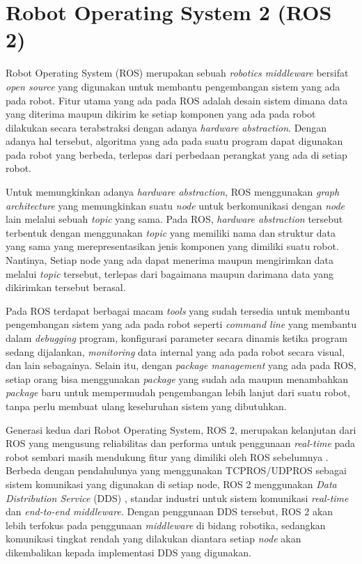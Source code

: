 \section{Robot Operating System 2 (ROS 2)}
\label{sec:ros2}

Robot Operating System (ROS) \citep{cit:quigley2009} merupakan sebuah \emph{robotics middleware} bersifat \emph{open source} yang digunakan untuk membantu pengembangan sistem yang ada pada robot.
Fitur utama yang ada pada ROS adalah desain sistem dimana data yang diterima maupun dikirim ke setiap komponen yang ada pada robot dilakukan secara terabstraksi dengan adanya \emph{hardware abstraction}.
Dengan adanya hal tersebut,
	algoritma yang ada pada suatu program dapat digunakan pada robot yang berbeda,
	terlepas dari perbedaan perangkat yang ada di setiap robot.

Untuk memungkinkan adanya \emph{hardware abstraction},
	ROS menggunakan \emph{graph architecture} yang memungkinkan suatu \emph{node} untuk berkomunikasi dengan \emph{node} lain melalui sebuah \emph{topic} yang sama.
Pada ROS, \emph{hardware abstraction} tersebut terbentuk dengan menggunakan \emph{topic} yang memiliki nama dan struktur data yang sama yang merepresentasikan jenis komponen yang dimiliki suatu robot.
Nantinya, Setiap node yang ada dapat menerima maupun mengirimkan data melalui \emph{topic} tersebut,
	terlepas dari bagaimana maupun darimana data yang dikirimkan tersebut berasal.

Pada ROS terdapat berbagai macam \emph{tools} yang sudah tersedia untuk membantu pengembangan sistem yang ada pada robot seperti \emph{command line} yang membantu dalam \emph{debugging} program,
	konfigurasi parameter secara dinamis ketika program sedang dijalankan,
	\emph{monitoring} data internal yang ada pada robot secara visual,
	dan lain sebagainya.
Selain itu, dengan \emph{package management} yang ada pada ROS,
	setiap orang bisa menggunakan \emph{package} yang sudah ada maupun menambahkan \emph{package} baru untuk mempermudah pengembangan lebih lanjut dari suatu robot,
	tanpa perlu membuat ulang keseluruhan sistem yang dibutuhkan.

Generasi kedua dari Robot Operating System, ROS 2,
	merupakan kelanjutan dari ROS yang mengusung reliabilitas dan performa untuk penggunaan \emph{real-time} pada robot sembari masih mendukung fitur yang dimiliki oleh ROS sebelumnya \citep{cit:maruyama2016}.
Berbeda dengan pendahulunya yang menggunakan TCPROS/UDPROS sebagai sistem komunikasi yang digunakan di setiap node,
	ROS 2 menggunakan \emph{Data Distribution Service} (DDS) \citep{cit:castellote2003} \citep{cit:schlesselman2004}, standar industri untuk sistem komunikasi \emph{real-time} dan \emph{end-to-end middleware}.
Dengan penggunaan DDS tersebut, ROS 2 akan lebih terfokus pada penggunaan \emph{middleware} di bidang robotika,
	sedangkan komunikasi tingkat rendah yang dilakukan diantara setiap \emph{node} akan dikembalikan kepada implementasi DDS yang digunakan.


